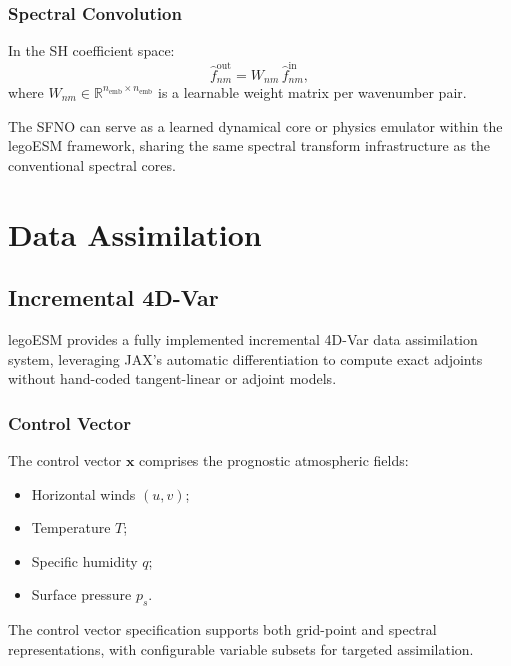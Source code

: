 \documentclass[11pt,twoside]{report}
\newcommand{\vect}[1]{\bm{#1}}
\begin{document}
\subsection{Spectral Convolution}

In the SH coefficient space:
\begin{equation}
  \hat f_{nm}^{\mathrm{out}} = W_{nm}\,\hat f_{nm}^{\mathrm{in}},
\end{equation}
where $W_{nm}\in\mathbb{R}^{n_{\mathrm{emb}}\times n_{\mathrm{emb}}}$ is a
learnable weight matrix per wavenumber pair.

The SFNO can serve as a learned dynamical core or physics emulator within
the legoESM framework, sharing the same spectral transform infrastructure
as the conventional spectral cores.


\chapter{Data Assimilation}
\label{ch:da}

\section{Incremental 4D-Var}

legoESM provides a fully implemented incremental 4D-Var data assimilation
system, leveraging JAX's automatic differentiation to compute exact
adjoints without hand-coded tangent-linear or adjoint models.

\subsection{Control Vector}

The control vector $\vect{x}$ comprises the prognostic atmospheric fields:
\begin{itemize}[nosep]
  \item Horizontal winds $(u, v)$;
  \item Temperature $T$;
  \item Specific humidity $q$;
  \item Surface pressure $p_s$.
\end{itemize}
The control vector specification supports both grid-point and spectral
representations, with configurable variable subsets for targeted assimilation.
\end{document}
